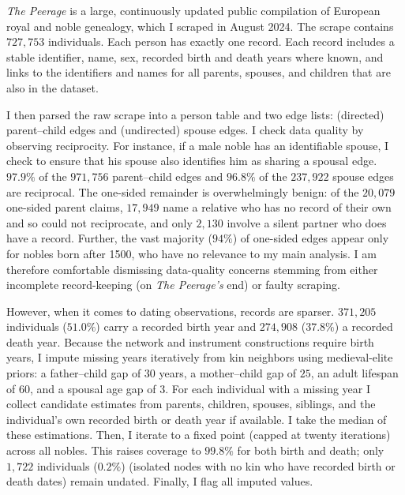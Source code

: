 \documentclass[12pt]{article}
\theoremstyle{definition}
\theoremstyle{remark}
\begin{document}
\emph{The Peerage} \citep{lundy_2024} is a large, continuously updated public compilation of European royal and noble genealogy, which I scraped in August 2024. The scrape contains $727{,}753$ individuals. Each person has exactly one record. Each record includes a stable identifier, name, sex, recorded birth and death years where known, and links to the identifiers and names for all parents, spouses, and children that are also in the dataset.

I then parsed the raw scrape into a person table and two edge lists: (directed) parent--child edges and (undirected) spouse edges. I check data quality by observing reciprocity. For instance, if a male noble has an identifiable spouse, I check to ensure that his spouse also identifies him as sharing a spousal edge. $97.9\%$ of the $971{,}756$ parent--child edges and $96.8\%$ of the $237{,}922$ spouse edges are reciprocal. The one-sided remainder is overwhelmingly benign: of the $20{,}079$ one-sided parent claims, $17{,}949$ name a relative who has no record of their own and so could not reciprocate, and only $2{,}130$ involve a silent partner who does have a record. Further, the vast majority ($94 \%$) of one-sided edges appear only for nobles born after 1500, who have no relevance to my main analysis. I am therefore comfortable dismissing data-quality concerns stemming from either incomplete record-keeping (on \textit{The Peerage's} end) or faulty scraping.

However, when it comes to dating observations, records are sparser. $371{,}205$ individuals ($51.0\%$) carry a recorded birth year and $274{,}908$ ($37.8\%$) a recorded death year. Because the network and instrument constructions require birth years, I impute missing years iteratively from kin neighbors using medieval-elite priors: a father--child gap of $30$ years, a mother--child gap of $25$, an adult lifespan of $60$, and a spousal age gap of $3$. For each individual with a missing year I collect candidate estimates from parents, children, spouses, siblings, and the individual's own recorded birth or death year if available. I take the median of these estimations. Then, I iterate to a fixed point (capped at twenty iterations) across all nobles. This raises coverage to $99.8\%$ for both birth and death; only $1{,}722$ individuals ($0.2\%$) (isolated nodes with no kin who have recorded birth or death dates) remain undated. Finally, I flag all imputed values.
\end{document}
